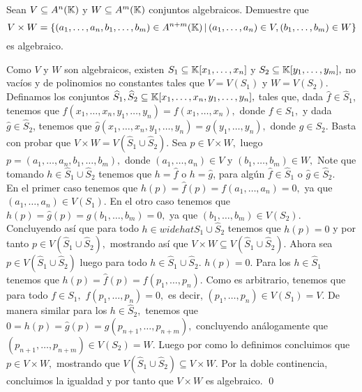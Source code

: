 \begin{homeworkProblem}
    Sean $V\subseteq A^n(\mathbb{K})$ y $W\subseteq A^m(\mathbb{K})$ conjuntos algebraicos. Demuestre que
    $$V\times W=\{(a_1,\ldots,a_n,b_1,\ldots,b_m)\in A^{n+m}(\mathbb{K})\,|\,(a_1,\ldots,a_n)\in V,(b_1,\ldots,b_m)\in W\}$$
    es algebraico.
    \begin{solucion}
        Como $V$ y $W$ son algebraicos, existen $S_1\subseteq \mathbb{K}[x_1,\ldots,x_n]$ y $S_2\subseteq \mathbb{K}[y_1,\ldots,y_m],$ no vacíos y de polinomios no constantes tales que $V=V(S_1)$ y $W=V(S_2).$ Definamos los conjuntos $\widehat{S}_1,\widehat{S}_2\subseteq \mathbb{K}[x_1,\ldots,x_n,y_1,\ldots,y_n],$ tales que, dada $\hat{f}\in \widehat{S}_1$, tenemos que $\hat{f}(x_1,\ldots,x_n,y_1,\ldots,y_n)=f(x_1,\ldots,x_n),$ donde $f\in S_1,$ y dada $\hat{g}\in\widehat{S}_2$, tenemos que $\hat{g}(x_1,\ldots,x_n,y_1,\ldots,y_n)=g(y_1,\ldots,y_n),$ donde $g\in S_2.$ Basta con probar que $V\times W=V(\widehat{S}_1\cup\widehat{S}_2).$ Sea $p\in V\times W,$ luego $p=(a_1,\ldots,a_n,b_1,\ldots,b_m),$ donde $(a_1,\ldots,a_n)\in V$ y $(b_1,\ldots,b_m)\in W,$ Note que tomando $h\in \widehat{S}_1\cup\widehat{S}_2 $ tenemos que $h=\hat{f}$ o $h=\hat{g}$, para algún $\hat{f}\in \widehat{S}_1$ o $\hat{g}\in\widehat{S}_2.$\\
        En el primer caso tenemos que $h(p)=\hat{f}(p)=f(a_1,\ldots,a_n)=0,$ ya que $(a_1,\ldots,a_n)\in V(S_1).$ En el otro caso tenemos que $h(p)=\hat{g}(p)=g(b_1,\ldots,b_m)=0,$ ya que $(b_1,\ldots,b_m)\in V(S_2).$ Concluyendo así que para todo $h\in widehat{S}_1\cup\widehat{S}_2$ tenemos que $h(p)=0$ y por tanto $p\in V(\widehat{S}_1\cup\widehat{S}_2),$ mostrando así que $V\times W\subseteq V(\widehat{S}_1\cup\widehat{S}_2).$ Ahora sea $p\in V(\widehat{S}_1\cup\widehat{S}_2)$ luego para todo $h\in \widehat{S}_1\cup\widehat{S}_2 .$ $h(p)=0.$ Para los $h\in \widehat{S}_1 $ tenemos que $h(p)=\hat{f}(p)=f(p_1,\ldots,p_n).$ Como es arbitrario, tenemos que para todo $f\in S_1,$ $f(p_1,\ldots,p_n)=0,$ es decir, $(p_1,\ldots,p_n)\in V(S_1)=V.$ De manera similar para los $h\in \widehat{S}_2,$ tenemos que $0=h(p)=\hat{g}(p)=g(p_{n+1},\ldots,p_{n+m}),$ concluyendo análogamente que $(p_{n+1},\ldots,p_{n+m})\in V(S_2)=W.$ Luego por como lo definimos concluimos que $p\in V\times W,$ mostrando que $V(\widehat{S}_1\cup\widehat{S}_2) \subseteq V\times W.$ Por la doble continencia, concluimos la igualdad y por tanto que $V\times W$ es algebraico. \qed
    \end{solucion}
\end{homeworkProblem}

